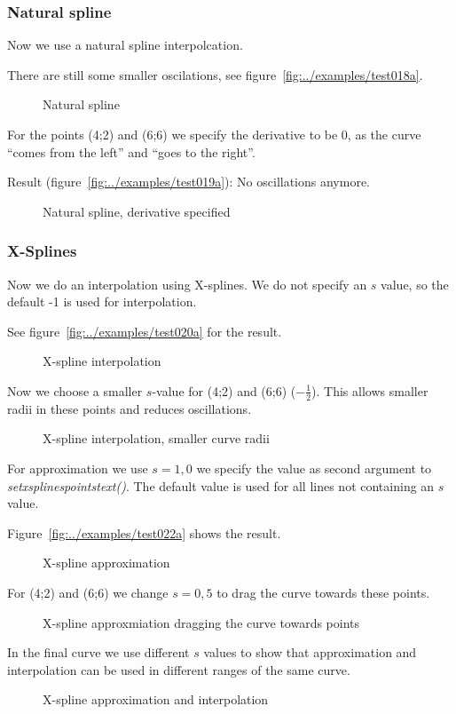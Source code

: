 \documentclass[origlongtable]{scrartcl}
\newcommand{\includepgfimage}[2]{%
\begin{figure}%
{\centering%
\caption{#2}\label{fig:#1}%
}%
\end{figure}%
}
\begin{document}
\subsubsection{Natural spline}
Now we use a natural spline interpolcation.


There are still some smaller oscilations, see figure~\vref{fig:../examples/test018a}.
\clearpage
\includepgfimage{../examples/test018a}{Natural spline}
\clearpage
For the points (4;2) and (6;6) we specify the derivative to be 0,
as the curve ``comes from the left'' and ``goes to the right''.

Result (figure~\vref{fig:../examples/test019a}): No oscillations anymore.
\clearpage
\includepgfimage{../examples/test019a}{Natural spline, derivative specified}
\clearpage
\subsubsection{X-Splines}
Now we do an interpolation using X-splines. We do not specify an
\(s\) value, so the default -1 is used for interpolation.

See figure~\vref{fig:../examples/test020a} for the result.
\clearpage
\includepgfimage{../examples/test020a}{X-spline interpolation}
\clearpage
Now we choose a smaller \(s\)-value for (4;2) and (6;6)
(\(-\tfrac{1}{2}\)). This allows smaller radii in these points
and reduces oscillations.

\includepgfimage{../examples/test021a}{X-spline interpolation, smaller curve radii}
\clearpage
For approximation we use
\(s=1,0\) we specify the value as second argument to
\textit{set\textunderscore{}xsplines\textunderscore{}points\textunderscore{}text()\/}.
The default value is used for all lines not containing an \(s\) value.

Figure~\vref{fig:../examples/test022a} shows the result.
\clearpage
\includepgfimage{../examples/test022a}{X-spline approximation}
\clearpage
For (4;2) and (6;6) we change \(s=0,5\) to drag the curve towards these points.

\clearpage
\includepgfimage{../examples/test023a}{X-spline approxmiation dragging the curve towards points}
\clearpage
In the final curve we use different \(s\) values to show that approximation
and interpolation can be used in different ranges of the same curve.

\clearpage
\includepgfimage{../examples/test024a}{X-spline approximation and interpolation}
\clearpage
\end{document}
